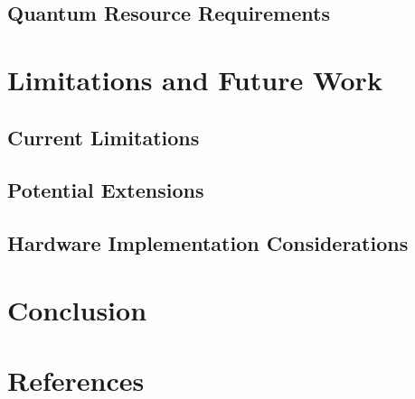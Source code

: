 \documentclass[conference]{IEEEtran}
\begin{document}
\subsection{Quantum Resource Requirements}

\section{Limitations and Future Work}
\subsection{Current Limitations}
\subsection{Potential Extensions}
\subsection{Hardware Implementation Considerations}

\section{Conclusion}

\section*{References}
\end{document}
